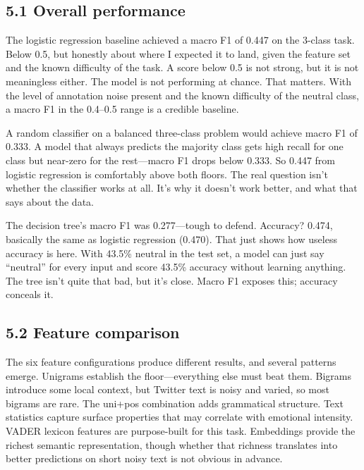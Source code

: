 \documentclass[12pt]{article}
\begin{document}
\subsection*{5.1 Overall performance}



The logistic regression baseline achieved a macro F1 of 0.447 on the 3-class task. Below 0.5, but honestly about where I expected it to land, given the feature set and the known difficulty of the task. A score below 0.5 is not strong, but it is not meaningless either. The model is not performing at chance. That matters. With the level of annotation noise present and the known difficulty of the neutral class, a macro F1 in the 0.4--0.5 range is a credible baseline.

A random classifier on a balanced three-class problem would achieve macro F1 of 0.333. A model that always predicts the majority class gets high recall for one class but near-zero for the rest---macro F1 drops below 0.333. So 0.447 from logistic regression is comfortably above both floors. The real question isn't whether the classifier works at all. It's why it doesn't work better, and what that says about the data.

The decision tree's macro F1 was 0.277---tough to defend. Accuracy? 0.474, basically the same as logistic regression (0.470). That just shows how useless accuracy is here. With 43.5\% neutral in the test set, a model can just say ``neutral'' for every input and score 43.5\% accuracy without learning anything. The tree isn't quite that bad, but it's close. Macro F1 exposes this; accuracy conceals it.



\subsection*{5.2 Feature comparison}



The six feature configurations produce different results, and several patterns emerge. Unigrams establish the floor---everything else must beat them. Bigrams introduce some local context, but Twitter text is noisy and varied, so most bigrams are rare. The uni+pos combination adds grammatical structure. Text statistics capture surface properties that may correlate with emotional intensity. VADER lexicon features are purpose-built for this task. Embeddings provide the richest semantic representation, though whether that richness translates into better predictions on short noisy text is not obvious in advance.
\end{document}

